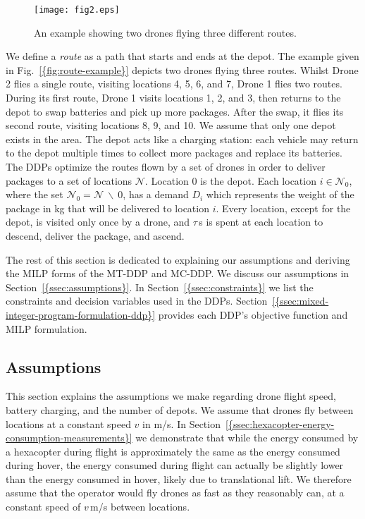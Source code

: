 \documentclass[journal]{IEEEtran}
\begin{document}
\begin{figure}[t!]
  \centering
      \texttt{[image: fig2.eps]}
  \caption{An example showing two drones flying three different routes.}
  \label{fig:route-example}
\end{figure}

We define a \emph{route} as a path that starts and ends at the depot. The example given in {Fig.~\ref{{fig:route-example}}} depicts two drones flying three routes. Whilst Drone 2 flies a single route, visiting locations 4, 5, 6, and 7, Drone 1 flies two routes. During its first route, Drone 1 visits locations 1, 2, and 3, then returns to the depot to swap batteries and pick up more packages. After the swap, it flies its second route, visiting locations 8, 9, and 10. We assume that only one depot exists in the area. The depot acts like a charging station: each vehicle may return to the depot multiple times to collect more packages and replace its batteries. The DDPs optimize the routes flown by a set of drones in order to deliver packages to a set of locations ${\ensuremath{\mathcal{N}}}$. Location 0 is the depot. Each location $i \in {\ensuremath{{\ensuremath{\mathcal{N}}}_{0}}}$, where the set ${\ensuremath{{\ensuremath{\mathcal{N}}}_{0}}} = {\ensuremath{\mathcal{N}}}\ \backslash\ 0$, has a demand ${\ensuremath{D_{{i}}}}$ which represents the weight of the package in kg that will be delivered to location $i$. Every location, except for the depot, is visited only once by a drone, and ${\ensuremath{\tau}}$\,s is spent at each location to descend, deliver the package, and ascend.

The rest of this section is dedicated to explaining our assumptions and deriving the MILP forms of the MT-DDP and MC-DDP. We discuss our assumptions in {Section~\ref{{ssec:assumptions}}}. In {Section~\ref{{ssec:constraints}}} we list the constraints and decision variables used in the DDPs. {Section~\ref{{ssec:mixed-integer-program-formulation-ddp}}} provides each DDP's objective function and MILP formulation.

\subsection{Assumptions}
\label{ssec:assumptions}

This section explains the assumptions we make regarding drone flight speed, battery charging, and the number of depots. We assume that drones fly between locations at a constant speed ${\ensuremath{v}}$ in m/s. In {Section~\ref{{ssec:hexacopter-energy-consumption-measurements}}} we demonstrate that while the energy consumed by a hexacopter during flight is approximately the same as the energy consumed during hover, the energy consumed during flight can actually be slightly lower than the energy consumed in hover, likely due to translational lift. We therefore assume that the operator would fly drones as fast as they reasonably can, at a constant speed of ${\ensuremath{v}}$\,m/s between locations.
\end{document}
